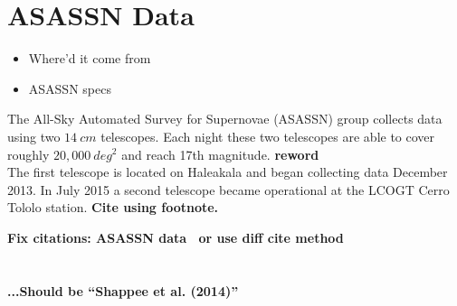 \documentclass[aps,prb,twocolumn,superscriptaddress]{revtex4-1}
\begin{document}
\section{ASASSN Data}
\begin{itemize}
	\item{} Where'd it come from
	\item{} ASASSN specs
\end{itemize}


\indent The All-Sky Automated Survey for Supernovae (ASASSN) group 
collects data using two $14~cm$ telescopes. Each night these two 
telescopes are able to cover roughly $20,000~deg^{2}$ and reach 17th magnitude.
{\bf reword}\\
The first telescope is located on Haleakala and began collecting data December 
2013. In July 2015 a second telescope became operational at the LCOGT 
Cerro Tololo station. {\bf Cite using footnote.}



{\bf Fix citations: ASASSN data~\cite{asn_data} or use diff cite method\\
\citet{asn_data}\\
\citealt{asn_data}\\
...Should be ``Shappee et al. (2014)''
}
\end{document}
